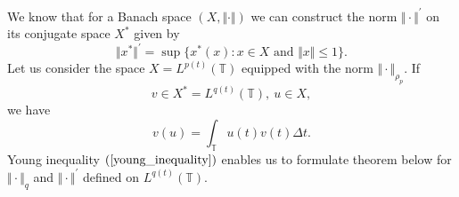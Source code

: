 \documentclass[12pt,a4paper,oneside,titlepage]{article}
\begin{document}
\indent
We know that for a Banach space $(X, \Vert \cdot \Vert)$ we can construct the norm $\Vert \cdot \Vert^{'}$ on its conjugate space $X^*$ given by
\begin{equation}
\Vert x^* \Vert^{'} = \sup \lbrace x^* (x) : x \in X \text{ and } \Vert x \Vert \leq 1 \rbrace.
\end{equation} 
Let us consider the space $X = L^{p(t)}(\mathbb{T})$ equipped with the norm $\Vert \cdot \Vert_{\rho_p}$. If
\begin{equation}
\nonumber
v \in X^*= L^{q(t)}(\mathbb{T}),~ u \in X,
\end{equation}
we have
\begin{equation}
\nonumber
v(u) = \int_{\mathbb{T}} u(t) v(t) \Delta t .
\end{equation}
\indent
Young inequality $(\ref{young_inequality})$ enables us to formulate theorem below for $\Vert \cdot \Vert_{q}$ and $\Vert \cdot \Vert^{'}$ defined on $L^{q(t)}(\mathbb{T})$.
\end{document}
